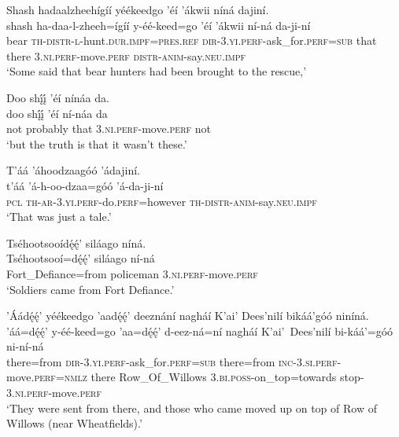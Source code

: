 \ea\label{ex:text3-6-2}
Shash hadaalzheehígíí yéékeedgo ’éí ’ákwii níná dajiní.\\
\gll shash	ha-daa-l-zheeh=ígíí	y-éé-keed=go	’éí	’ákwii	ní-ná	da-ji-ní\\
     bear	\textsc{th}-\textsc{distr}-\textsc{l}-hunt.\textsc{dur}.\textsc{impf}=\textsc{pres}.\textsc{ref}	\textsc{dir}-3.\textsc{yi}.\textsc{perf}-ask\_for.\textsc{perf}=\textsc{sub}	that	there	3.\textsc{ni}.\textsc{perf}-move.\textsc{perf}	\textsc{distr}-\textsc{anim}-say.\textsc{neu}.\textsc{impf}\\
\glt `Some said that bear hunters had been brought to the rescue,'
\z

\ea\label{ex:text3-6-3}
Doo shį́į́ ’éí nínáa da.\\
\gll doo	shį́į́	’éí	ní-náa	da\\
     not	probably	that	3.\textsc{ni}.\textsc{perf}-move.\textsc{perf}	not\\
\glt `but the truth is that it wasn't these.'
\z

\ea\label{ex:text3-6-4}
T’áá ’áhoodzaagóó ’ádajiní.\\
\gll t’áá	’á-h-oo-dzaa=góó	’á-da-ji-ní\\
     \textsc{pcl}	\textsc{th}-\textsc{ar}-3.\textsc{yi}.\textsc{perf}-do.\textsc{perf}=however	\textsc{th}-\textsc{distr}-\textsc{anim}-say.\textsc{neu}.\textsc{impf}\\
\glt `That was just a tale.'
\z

\ea\label{ex:text3-6-5}
Tséhootsooídę́ę́’ siláago níná.\\
\gll Tséhootsooí=dę́ę́’	siláago	ní-ná\\
     Fort\_Defiance=from	policeman	3.\textsc{ni}.\textsc{perf}-move.\textsc{perf}\\
\glt `Soldiers came from Fort Defiance.'
\z

\ea\label{ex:text3-6-6}
’Áádę́ę́’ yéékeedgo ’aadę́ę́’ deeznání nagháí K’ai’ Dees’nilí bikáá’góó niníná.\\
\gll ’áá=dę́ę́’	y-éé-keed=go	’aa=dę́ę́’	d-eez-ná=ní	nagháí	K’ai’~{Dees’nilí}	bi-káá’=góó	ni-ní-ná\\
     there=from	\textsc{dir}-3.\textsc{yi}.\textsc{perf}-ask\_for.\textsc{perf}=\textsc{sub}	there=from	\textsc{inc}-3.\textsc{si}.\textsc{perf}-move.\textsc{perf}=\textsc{nmlz}	there	Row\_Of\_Willows	3.\textsc{bi}.\textsc{poss}-on\_top=towards	stop-3.\textsc{ni}.\textsc{perf}-move.\textsc{perf}\\
\glt `They were sent from there, and those who came moved up on top of Row of Willows (near Wheatfields).'
\z

